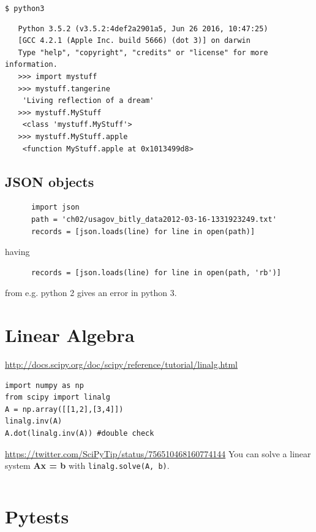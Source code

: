 \documentclass[11pt,a4paper]{article}
\begin{document}
     {\tt \$ python3}
    \begin{lstlisting}
   Python 3.5.2 (v3.5.2:4def2a2901a5, Jun 26 2016, 10:47:25) 
   [GCC 4.2.1 (Apple Inc. build 5666) (dot 3)] on darwin
   Type "help", "copyright", "credits" or "license" for more information.
   >>> import mystuff
   >>> mystuff.tangerine
    'Living reflection of a dream'
   >>> mystuff.MyStuff
    <class 'mystuff.MyStuff'>
   >>> mystuff.MyStuff.apple
    <function MyStuff.apple at 0x1013499d8>
    \end{lstlisting}

    \subsection{JSON objects}
    \begin{lstlisting}
      import json
      path = 'ch02/usagov_bitly_data2012-03-16-1331923249.txt'
      records = [json.loads(line) for line in open(path)]
    \end{lstlisting}
    having
    \begin{lstlisting}
      records = [json.loads(line) for line in open(path, 'rb')]
      \end{lstlisting}
      from e.g. python 2 gives an error in python 3. 





\newpage
\section{Linear Algebra}
\href{http://docs.scipy.org/doc/scipy/reference/tutorial/linalg.html}{http://docs.scipy.org/doc/scipy/reference/tutorial/linalg.html}

\begin{lstlisting}
import numpy as np
from scipy import linalg
A = np.array([[1,2],[3,4]])
linalg.inv(A)
A.dot(linalg.inv(A)) #double check
\end{lstlisting}

\noindent
\href{https://twitter.com/SciPyTip/status/756510468160774144}{https://twitter.com/SciPyTip/status/756510468160774144}
You can solve a linear system {\bf Ax = b} with {\tt linalg.solve(A, b)}.
\begin{lstlisting}

\end{lstlisting}





\newpage
\section{Pytests}
\end{document}
